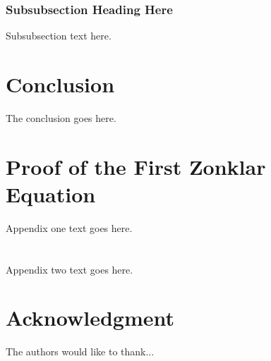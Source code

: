 \documentclass[journal]{IEEEtran}
\begin{document}
\subsubsection{Subsubsection Heading Here}
Subsubsection text here.


\section{Conclusion}
The conclusion goes here.

\appendices
\section{Proof of the First Zonklar Equation}
Appendix one text goes here.

\section{}
Appendix two text goes here.


\section*{Acknowledgment}
The authors would like to thank...


\ifCLASSOPTIONcaptionsoff
  \newpage
\fi


\end{document}

